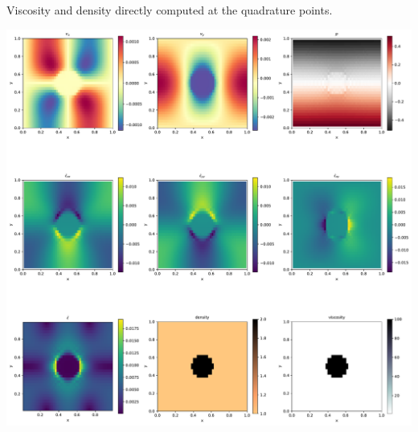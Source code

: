 
Viscosity and density directly computed at the quadrature points.


\includegraphics[width=16cm]{python_codes/fieldstone_02/solution.pdf}

